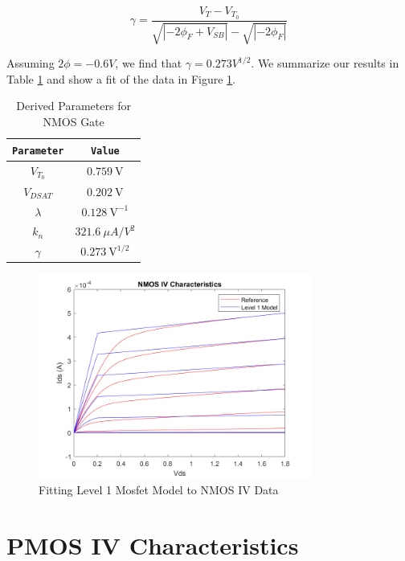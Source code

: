 \documentclass{article}
\begin{document}
	\begin{equation}
		\gamma = \frac{V_T - V_{T_0}}{\sqrt{|-2\phi_F + V_{SB}|} - {\sqrt{|-2\phi_F|}}} 
	\end{equation}
	
	\noindent Assuming $2\phi = -0.6 V$, we find that $\gamma = 0.273 V^{1/2}$. We summarize our results in Table \ref{table::nmos_derived_params} and show a fit of the data in Figure \ref{fig::nmos_iv_fit}.
	
	\begin{table}[H]
	\begin{center}
	\caption{Derived Parameters for NMOS Gate}
	\label{table::nmos_derived_params}
	\begin{tabular}{| c | c |}
		\hline
		\texttt{Parameter} & \texttt{Value}\\
		\hline	
		$V_{T_0}$ & $0.759\ \text{V}$ \\
		\hline	
		$V_{DSAT}$ & $0.202\ \text{V}$ \\
		\hline	
		$\lambda$ & $0.128\ \text{V}^{-1}$\\
		\hline	
		$k_n$ & $321.6\ {\mu}A/V^2$\\
		\hline	
		$\gamma$ & $0.273\ \text{V}^{1/2}$\\
		\hline
	\end{tabular}
	\end{center}
	\end{table}
	
	\begin{figure}[H]
		\centerline{\includegraphics[width=0.8\textwidth]{nmos_iv_fit.png}}
		\caption{Fitting Level 1 Mosfet Model to NMOS IV Data}
		\label{fig::nmos_iv_fit}
	\end{figure}	
	
	\pagebreak
	\section{PMOS IV Characteristics}
	\label{appendix::pmos_iv_characteristics}
	
\end{document}
